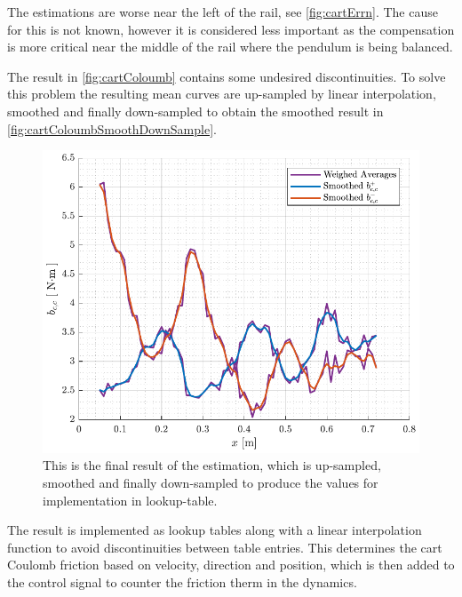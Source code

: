 %
The estimations are worse near the left of the rail, see \autoref{fig:cartErrn}. The cause for this is not known, however it is considered less important as the compensation is more critical near the middle of the rail where the pendulum is being balanced.

The result in \autoref{fig:cartColoumb} contains some undesired discontinuities. To solve this problem the resulting mean curves are up-sampled by linear interpolation, smoothed and finally down-sampled to obtain the smoothed result in \autoref{fig:cartColoumbSmoothDownSample}.
\begin{figure}[H]
  \includegraphics[width=.42\textwidth]{figures/cartColoumbSmoothDownSample}
  \caption{This is the final result of the estimation, which is up-sampled, smoothed and finally down-sampled to produce the values for implementation in lookup-table.}
  \label{fig:cartColoumbSmoothDownSample}
\end{figure}
The result is implemented as lookup tables along with a linear interpolation function to avoid discontinuities between table entries. This determines the cart Coulomb friction based on velocity, direction and position, which is then added to the control signal to counter the friction therm in the dynamics.

